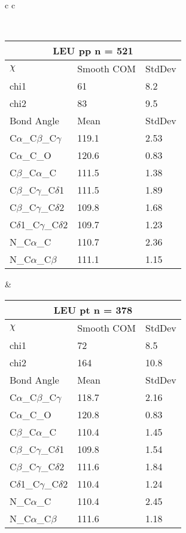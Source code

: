 \newpage

\begin{longtable}{ c c }

\caption{LEU Central Values}\\
  \begin{tabular}{ l l l }
  \toprule
  \multicolumn{3}{c}{LEU \textbf{pp} n = 521} \\ \toprule
  $\chi$       & Smooth COM & StdDev \\ \midrule
  chi1 & 61 & 8.2 \\ 
  chi2 & 83 & 9.5 \\ \midrule
  Bond Angle   & Mean     & StdDev \\ \midrule
  C$\alpha$\_C$\beta$\_C$\gamma$ & 119.1 & 2.53\\
  C$\alpha$\_C\_O & 120.6 & 0.83\\
  C$\beta$\_C$\alpha$\_C & 111.5 & 1.38\\
  C$\beta$\_C$\gamma$\_C$\delta$1 & 111.5 & 1.89\\
  C$\beta$\_C$\gamma$\_C$\delta$2 & 109.8 & 1.68\\
  C$\delta$1\_C$\gamma$\_C$\delta$2 & 109.7 & 1.23\\
  N\_C$\alpha$\_C & 110.7 & 2.36\\
  N\_C$\alpha$\_C$\beta$ & 111.1 & 1.15\\
  \bottomrule
  \end{tabular}
  &
  \begin{tabular}{ l l l }
  \toprule
  \multicolumn{3}{c}{LEU \textbf{pt} n = 378} \\ \toprule
  $\chi$       & Smooth COM & StdDev \\ \midrule
  chi1 & 72 & 8.5 \\ 
  chi2 & 164 & 10.8 \\ \midrule
  Bond Angle   & Mean     & StdDev \\ \midrule
  C$\alpha$\_C$\beta$\_C$\gamma$ & 118.7 & 2.16\\
  C$\alpha$\_C\_O & 120.8 & 0.83\\
  C$\beta$\_C$\alpha$\_C & 110.4 & 1.45\\
  C$\beta$\_C$\gamma$\_C$\delta$1 & 109.8 & 1.54\\
  C$\beta$\_C$\gamma$\_C$\delta$2 & 111.6 & 1.84\\
  C$\delta$1\_C$\gamma$\_C$\delta$2 & 110.4 & 1.24\\
  N\_C$\alpha$\_C & 110.4 & 2.45\\
  N\_C$\alpha$\_C$\beta$ & 111.6 & 1.18\\

\end{tabular}
\end{longtable}
